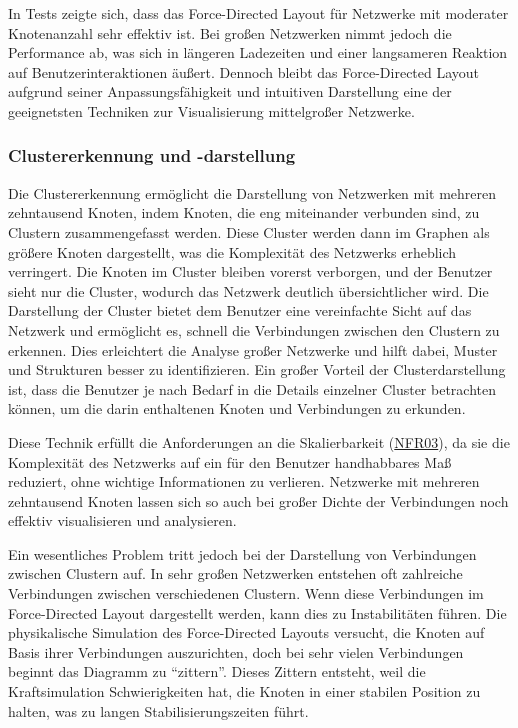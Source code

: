 In Tests zeigte sich, dass das Force-Directed Layout für Netzwerke mit moderater Knotenanzahl sehr effektiv ist. Bei großen Netzwerken nimmt jedoch die Performance ab, was sich in längeren Ladezeiten und einer langsameren Reaktion auf Benutzerinteraktionen äußert. Dennoch bleibt das Force-Directed Layout aufgrund seiner Anpassungsfähigkeit und intuitiven Darstellung eine der geeignetsten Techniken zur Visualisierung mittelgroßer Netzwerke.

\subsubsection{Clustererkennung und -darstellung}

Die Clustererkennung ermöglicht die Darstellung von Netzwerken mit mehreren zehntausend Knoten, indem Knoten, die eng miteinander verbunden sind, zu Clustern zusammengefasst werden. Diese Cluster werden dann im Graphen als größere Knoten dargestellt, was die Komplexität des Netzwerks erheblich verringert. Die Knoten im Cluster bleiben vorerst verborgen, und der Benutzer sieht nur die Cluster, wodurch das Netzwerk deutlich übersichtlicher wird. Die Darstellung der Cluster bietet dem Benutzer eine vereinfachte Sicht auf das Netzwerk und ermöglicht es, schnell die Verbindungen zwischen den Clustern zu erkennen. Dies erleichtert die Analyse großer Netzwerke und hilft dabei, Muster und Strukturen besser zu identifizieren. Ein großer Vorteil der Clusterdarstellung ist, dass die Benutzer je nach Bedarf in die Details einzelner Cluster betrachten können, um die darin enthaltenen Knoten und Verbindungen zu erkunden.

Diese Technik erfüllt die Anforderungen an die Skalierbarkeit (\hyperref[NFR03]{NFR03}), da sie die Komplexität des Netzwerks auf ein für den Benutzer handhabbares Maß reduziert, ohne wichtige Informationen zu verlieren. Netzwerke mit mehreren zehntausend Knoten lassen sich so auch bei großer Dichte der Verbindungen noch effektiv visualisieren und analysieren.

Ein wesentliches Problem tritt jedoch bei der Darstellung von Verbindungen zwischen Clustern auf. In sehr großen Netzwerken entstehen oft zahlreiche Verbindungen zwischen verschiedenen Clustern. Wenn diese Verbindungen im Force-Directed Layout dargestellt werden, kann dies zu Instabilitäten führen. Die physikalische Simulation des Force-Directed Layouts versucht, die Knoten auf Basis ihrer Verbindungen auszurichten, doch bei sehr vielen Verbindungen beginnt das Diagramm zu \enquote{zittern}. Dieses Zittern entsteht, weil die Kraftsimulation Schwierigkeiten hat, die Knoten in einer stabilen Position zu halten, was zu langen Stabilisierungszeiten führt.

